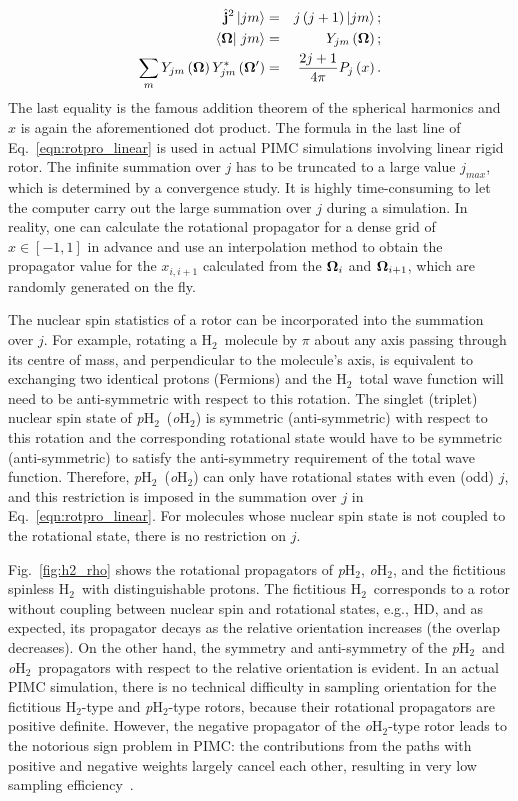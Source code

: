\documentclass[12pt]{iopart}
\newcommand{\hydrogen}{H$_2$}
\newcommand{\phtwo}{{\em p}H$_2$}
\newcommand{\ohtwo}{{\em o}H$_2$}
\begin{document}
\begin{eqnarray}
\hat{{\bf j}}^2\left|jm \right>&=&j\left(j+1\right)\left|jm\right>; \\
\left<{\bf \Omega}\right|\left.jm\right>&=&Y_{jm}\left({\bf \Omega}\right);\\
\sum_m Y_{jm}\left({\bf \Omega}\right)Y_{jm}^*\left({\bf \Omega}'\right)&=&\frac{2j+1}{4\pi}P_j\left(x \right).
\end{eqnarray}
The last equality is the famous addition theorem of the spherical harmonics and $x$ is again the aforementioned dot product. The formula in the last line of Eq.~\ref{eqn:rotpro_linear} is used in actual PIMC simulations involving linear rigid rotor. The infinite summation over $j$ has to be truncated to a large value $j_{max}$, which is determined by a convergence study. It is highly time-consuming to let the computer carry out the large summation over $j$ during a simulation. In reality, one can calculate the rotational propagator for a dense grid of $x\in \left[ -1,1 \right]$ in advance and use an interpolation method to obtain  the propagator value for the $x_{i,i+1}$ calculated from the ${\bf \Omega}_i$ and ${\bf \Omega}_{i+1}$, which are randomly generated on the fly.

The nuclear spin statistics of a rotor can be incorporated into the summation over $j$. 
For example, rotating a \hydrogen~molecule by $\pi$ about any axis passing through its centre of mass, and perpendicular to the molecule's axis, is equivalent to exchanging two identical protons (Fermions) and the \hydrogen~total wave function will need to be anti-symmetric with respect to this rotation. The singlet (triplet) nuclear spin state of \phtwo~(\ohtwo) is symmetric (anti-symmetric) with respect to this rotation and the corresponding rotational state would have to be symmetric (anti-symmetric) to satisfy the anti-symmetry requirement of the total wave function. Therefore, \phtwo~(\ohtwo) can only have rotational states with even (odd) $j$, and this restriction is imposed in the summation over $j$ in Eq.~\ref{eqn:rotpro_linear}. For molecules whose nuclear spin state is not coupled to the rotational state, there is no restriction on $j$.

Fig.~\ref{fig:h2_rho} shows the rotational propagators of \phtwo, \ohtwo, and the fictitious spinless \hydrogen~with distinguishable protons. The fictitious \hydrogen~corresponds to a rotor without coupling between nuclear spin and rotational states, e.g., HD, and as expected, its propagator decays as the relative orientation increases (the overlap decreases). 
On the other hand, the symmetry and anti-symmetry of the \phtwo~and \ohtwo~propagators with respect to the relative orientation is evident. 
In an actual PIMC simulation, there is no technical difficulty in sampling orientation for the fictitious \hydrogen-type and \phtwo-type rotors, because their rotational propagators are positive definite. However, the negative propagator of the \ohtwo-type rotor leads to the notorious sign problem in PIMC: the contributions from the paths with positive and negative weights largely cancel each other, resulting in very low sampling efficiency~\cite{ceperley_pimc_fermions,Mak_pimc_sign}.
\end{document}
